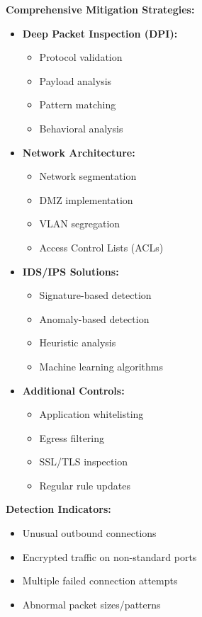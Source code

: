 \documentclass[12pt]{article}
\begin{document}
\textbf{Comprehensive Mitigation Strategies:}
\begin{itemize}
  \item \textbf{Deep Packet Inspection (DPI):}
    \begin{itemize}
      \item Protocol validation
      \item Payload analysis
      \item Pattern matching
      \item Behavioral analysis
    \end{itemize}
  \item \textbf{Network Architecture:}
    \begin{itemize}
      \item Network segmentation
      \item DMZ implementation
      \item VLAN segregation
      \item Access Control Lists (ACLs)
    \end{itemize}
  \item \textbf{IDS/IPS Solutions:}
    \begin{itemize}
      \item Signature-based detection
      \item Anomaly-based detection
      \item Heuristic analysis
      \item Machine learning algorithms
    \end{itemize}
  \item \textbf{Additional Controls:}
    \begin{itemize}
      \item Application whitelisting
      \item Egress filtering
      \item SSL/TLS inspection
      \item Regular rule updates
    \end{itemize}
\end{itemize}

\textbf{Detection Indicators:}
\begin{itemize}
  \item Unusual outbound connections
  \item Encrypted traffic on non-standard ports
  \item Multiple failed connection attempts
  \item Abnormal packet sizes/patterns
\end{itemize}
\end{document}
